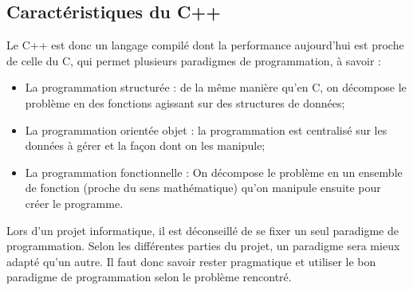 \subsection{Caractéristiques du C++}

Le C++ est donc un langage compilé dont la performance aujourd'hui est proche de celle du C, qui permet plusieurs paradigmes de programmation, à savoir :
\begin{itemize}
    \item La programmation structurée : de la même manière qu'en C, on décompose le problème en des fonctions agissant sur des structures de données;
    \item La programmation orientée objet : la programmation est centralisé sur les données à gérer et la façon dont on les manipule;
    \item La programmation fonctionnelle : On décompose le problème en un ensemble de fonction (proche du sens mathématique) qu'on manipule ensuite pour créer le programme.
\end{itemize}

Lors d'un projet informatique, il est déconseillé de se fixer un seul paradigme de programmation. Selon les différentes parties du projet, un paradigme sera mieux adapté qu'un autre. Il faut donc savoir rester pragmatique et utiliser le bon paradigme de programmation selon le problème rencontré. 

